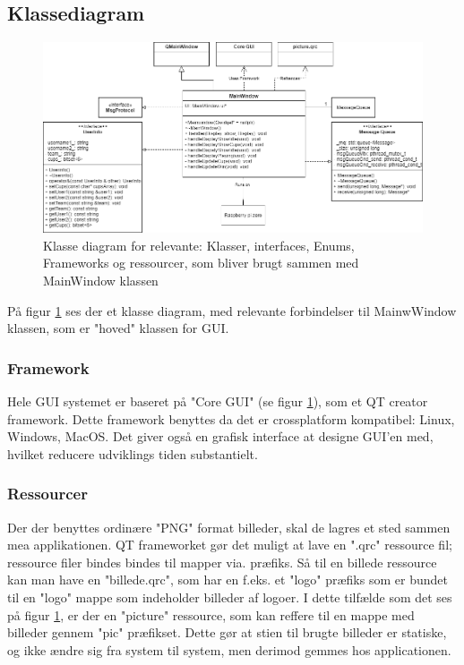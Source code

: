 \documentclass[Softwaredesign/Softwaredesign_main.tex]{subfiles}
\begin{document}
\subsection{Klassediagram}
\begin{figure}
    \centering
    \includegraphics[scale=0.4]{Softwaredesign/GUI/Pictures/Guiklassediagram.png}
    \caption{Klasse diagram for relevante: Klasser, interfaces, Enums, Frameworks og ressourcer, som bliver brugt sammen med MainWindow klassen}
    \label{fig:Gui_klassediagram}
\end{figure}

På figur \ref{fig:Gui_klassediagram} ses der et klasse diagram, med relevante forbindelser til MainwWindow klassen, som er "hoved" klassen for GUI. 

\subsubsection{Framework}
Hele GUI systemet er baseret på "Core GUI" (se figur \ref{fig:Gui_klassediagram}), som et QT creator framework. Dette framework benyttes da det er crossplatform kompatibel: Linux, Windows, MacOS. Det giver også en grafisk interface at designe GUI'en med, hvilket reducere udviklings tiden substantielt. 

\subsubsection{Ressourcer}
Der der benyttes ordinære "PNG" format billeder, skal de lagres et sted sammen mea applikationen. QT frameworket gør det muligt at lave en ".qrc" ressource fil; ressource filer bindes bindes til mapper via. præfiks. Så til en billede ressource kan man have en "billede.qrc", som har en f.eks. et "logo" præfiks som er bundet til en "logo" mappe som indeholder billeder af logoer. I dette tilfælde som det ses på figur \ref{fig:Gui_klassediagram}, er der en "picture" ressource, som kan reffere til en mappe med billeder gennem "pic" præfikset. Dette gør at stien til brugte billeder er statiske, og ikke ændre sig fra system til system, men derimod gemmes hos applicationen.
\end{document}
